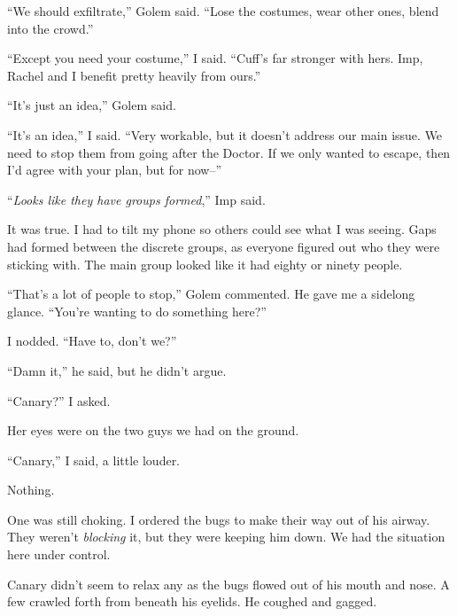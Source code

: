 ``We should exfiltrate,'' Golem said.  ``Lose the costumes, wear other ones, blend into the crowd.''



``Except you need your costume,'' I said.  ``Cuff's far stronger with hers.  Imp, Rachel and I benefit pretty heavily from ours.''



``It's just an idea,'' Golem said.



``It's an idea,'' I said.  ``Very workable, but it doesn't address our main issue.  We need to stop them from going after the Doctor.  If we only wanted to escape, then I'd agree with your plan, but for now--''



``\emph{Looks like they have groups formed},'' Imp said.



It was true.  I had to tilt my phone so others could see what I was seeing.  Gaps had formed between the discrete groups, as everyone figured out who they were sticking with.  The main group looked like it had eighty or ninety people.



``That's a lot of people to stop,'' Golem commented.  He gave me a sidelong glance.  ``You're wanting to do something here?''



I nodded.  ``Have to, don't we?''



``Damn it,'' he said, but he didn't argue.



``Canary?'' I asked.



Her eyes were on the two guys we had on the ground.



``Canary,'' I said, a little louder.



Nothing.



One was still choking.  I ordered the bugs to make their way out of his airway.  They weren't \emph{blocking} it, but they were keeping him down.  We had the situation here under control.



Canary didn't seem to relax any as the bugs flowed out of his mouth and nose.  A few crawled forth from beneath his eyelids.  He coughed and gagged.



